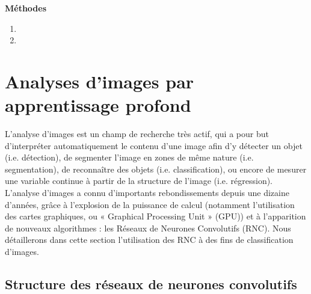 \setcounter{section}{0} %
\renewcommand*{\theHsection}{Methodes.\the\value{section}}

\centerline{\bfseries\textcolor{bleusection}{ \Huge Méthodes}}  

\bigskip


{\LARGE
\begin{enumerate}[label=\textcolor{bleusection}{\arabic*}{.}, leftmargin=2cm]
  \item {}
  \item {}
\end{enumerate}
}

\clearpage
\pagestyle{methodo}

\section{Analyses d'images par apprentissage profond}\label{methodes.1}

L’analyse d’images est un champ de recherche très actif, qui a pour but d’interpréter automatiquement le contenu d’une image afin d’y détecter un objet (i.e. détection), de segmenter l’image en zones de même nature (i.e. segmentation), de reconnaître des objets (i.e. classification), ou encore de mesurer une variable continue à partir de la structure de l’image (i.e. régression). L’analyse d’images a connu d’importants rebondissements depuis une dizaine d’années, grâce à l’explosion de la puissance de calcul (notamment l’utilisation des cartes graphiques, ou « Graphical Processing Unit » (GPU)) et à l’apparition de nouveaux algorithmes : les Réseaux de Neurones Convolutifs (RNC). Nous détaillerons dans cette section l’utilisation des RNC à des fins de classification d’images.

\subsection{Structure des réseaux de neurones convolutifs}

